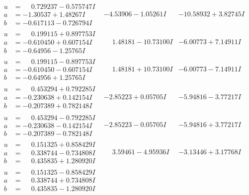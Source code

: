 \documentclass[1p]{elsarticle_modified}
\theoremstyle{definition}
\begin{document}
$$\begin{array}{c|c|c}
\begin{aligned}
u &= \phantom{-}0.729237 - 0.575747 I \\
a &= -1.30537 + 1.48267 I \\
b &= -0.617113 - 0.726794 I\end{aligned}
 & -4.53906 - 1.05261 I & -10.58932 + 3.82745 I \\ \hline\begin{aligned}
u &= \phantom{-}0.199115 + 0.897753 I \\
a &= -0.610450 + 0.607154 I \\
b &= -0.64956 - 1.25765 I\end{aligned}
 & \phantom{-}1.48181 - 10.73100 I & -6.00773 + 7.14911 I \\ \hline\begin{aligned}
u &= \phantom{-}0.199115 - 0.897753 I \\
a &= -0.610450 - 0.607154 I \\
b &= -0.64956 + 1.25765 I\end{aligned}
 & \phantom{-}1.48181 + 10.73100 I & -6.00773 - 7.14911 I \\ \hline\begin{aligned}
u &= \phantom{-}0.453294 + 0.792285 I \\
a &= -0.230638 + 0.142154 I \\
b &= -0.207389 + 0.782148 I\end{aligned}
 & -2.85223 + 0.05705 I & -5.94816 - 3.77217 I \\ \hline\begin{aligned}
u &= \phantom{-}0.453294 - 0.792285 I \\
a &= -0.230638 - 0.142154 I \\
b &= -0.207389 - 0.782148 I\end{aligned}
 & -2.85223 - 0.05705 I & -5.94816 + 3.77217 I \\ \hline\begin{aligned}
u &= \phantom{-}0.151325 + 0.858429 I \\
a &= \phantom{-}0.338744 - 0.734808 I \\
b &= \phantom{-}0.435835 + 1.280920 I\end{aligned}
 & \phantom{-}3.59461 - 4.95936 I & -3.13446 + 3.17768 I \\ \hline\begin{aligned}
u &= \phantom{-}0.151325 - 0.858429 I \\
a &= \phantom{-}0.338744 + 0.734808 I \\
b &= \phantom{-}0.435835 - 1.280920 I\end{aligned}

\end{array}$$
\end{document}
